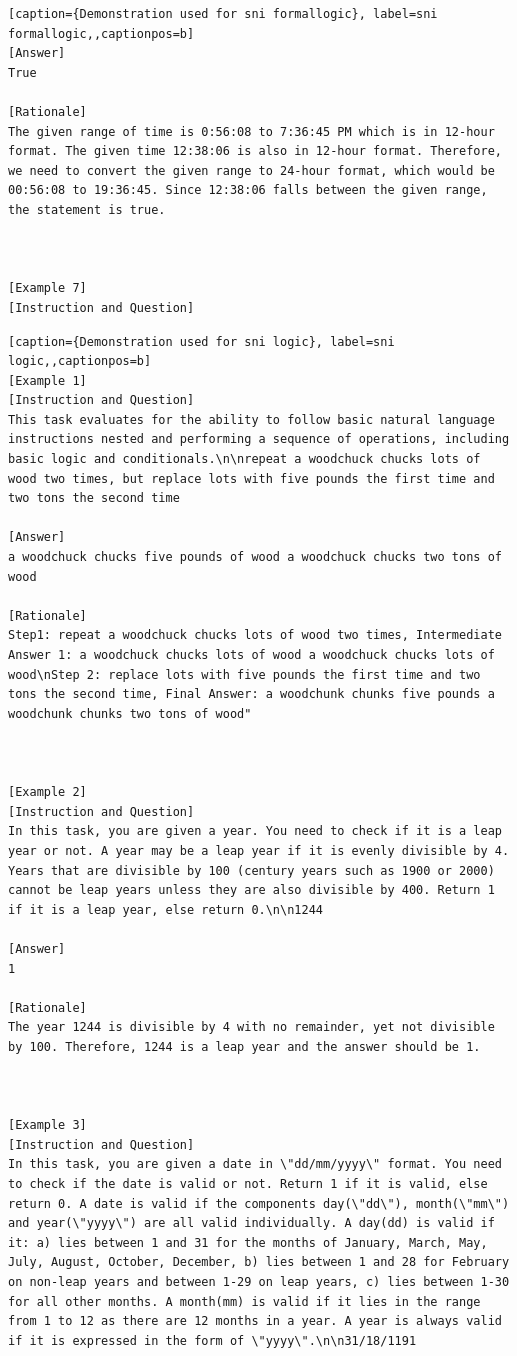 \begin{lstlisting}[caption={Demonstration used for sni formallogic}, label=sni formallogic,,captionpos=b]
[Answer]
True

[Rationale]
The given range of time is 0:56:08 to 7:36:45 PM which is in 12-hour format. The given time 12:38:06 is also in 12-hour format. Therefore, we need to convert the given range to 24-hour format, which would be 00:56:08 to 19:36:45. Since 12:38:06 falls between the given range, the statement is true.



[Example 7]
[Instruction and Question]

    \end{lstlisting}
    





\begin{lstlisting}[caption={Demonstration used for sni logic}, label=sni logic,,captionpos=b]
[Example 1]
[Instruction and Question]
This task evaluates for the ability to follow basic natural language instructions nested and performing a sequence of operations, including basic logic and conditionals.\n\nrepeat a woodchuck chucks lots of wood two times, but replace lots with five pounds the first time and two tons the second time

[Answer]
a woodchuck chucks five pounds of wood a woodchuck chucks two tons of wood

[Rationale]
Step1: repeat a woodchuck chucks lots of wood two times, Intermediate Answer 1: a woodchuck chucks lots of wood a woodchuck chucks lots of wood\nStep 2: replace lots with five pounds the first time and two tons the second time, Final Answer: a woodchunk chunks five pounds a woodchunk chunks two tons of wood"



[Example 2]
[Instruction and Question]
In this task, you are given a year. You need to check if it is a leap year or not. A year may be a leap year if it is evenly divisible by 4. Years that are divisible by 100 (century years such as 1900 or 2000) cannot be leap years unless they are also divisible by 400. Return 1 if it is a leap year, else return 0.\n\n1244

[Answer]
1

[Rationale]
The year 1244 is divisible by 4 with no remainder, yet not divisible by 100. Therefore, 1244 is a leap year and the answer should be 1.



[Example 3]
[Instruction and Question]
In this task, you are given a date in \"dd/mm/yyyy\" format. You need to check if the date is valid or not. Return 1 if it is valid, else return 0. A date is valid if the components day(\"dd\"), month(\"mm\") and year(\"yyyy\") are all valid individually. A day(dd) is valid if it: a) lies between 1 and 31 for the months of January, March, May, July, August, October, December, b) lies between 1 and 28 for February on non-leap years and between 1-29 on leap years, c) lies between 1-30 for all other months. A month(mm) is valid if it lies in the range from 1 to 12 as there are 12 months in a year. A year is always valid if it is expressed in the form of \"yyyy\".\n\n31/18/1191


\end{lstlisting}
